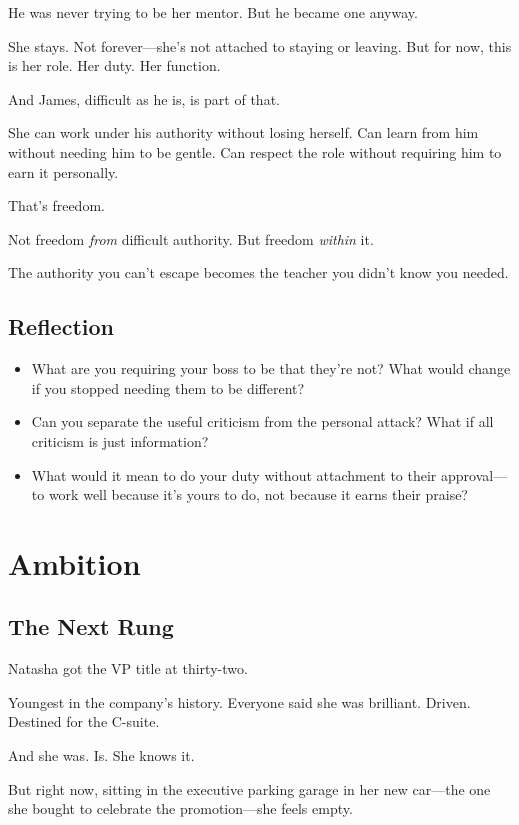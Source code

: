 \documentclass[11pt,twoside]{book}
\begin{document}
He was never trying to be her mentor. But he became one anyway.

She stays. Not forever—she's not attached to staying or leaving. But for now, this is her role. Her duty. Her function.

And James, difficult as he is, is part of that.

She can work under his authority without losing herself. Can learn from him without needing him to be gentle. Can respect the role without requiring him to earn it personally.

That's freedom.

Not freedom \emph{from} difficult authority. But freedom \emph{within} it.

The authority you can't escape becomes the teacher you didn't know you needed.

\section*{Reflection}

\begin{itemize}
\item What are you requiring your boss to be that they're not? What would change if you stopped needing them to be different?
\item Can you separate the useful criticism from the personal attack? What if all criticism is just information?
\item What would it mean to do your duty without attachment to their approval—to work well because it's yours to do, not because it earns their praise?
\end{itemize}

\chapter{Ambition}

\section*{The Next Rung}

Natasha got the VP title at thirty-two.

Youngest in the company's history. Everyone said she was brilliant. Driven. Destined for the C-suite.

And she was. Is. She knows it.

But right now, sitting in the executive parking garage in her new car—the one she bought to celebrate the promotion—she feels empty.
\end{document}
